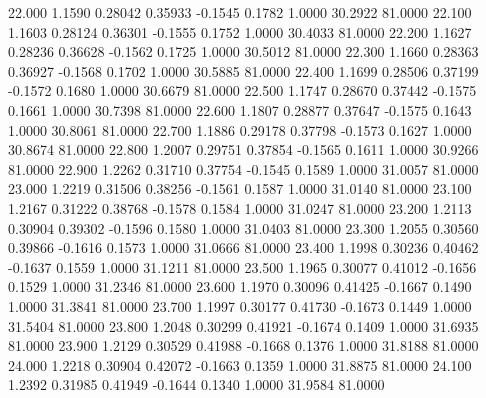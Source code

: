  22.000   1.1590   0.28042   0.35933  -0.1545   0.1782   1.0000  30.2922  81.0000
  22.100   1.1603   0.28124   0.36301  -0.1555   0.1752   1.0000  30.4033  81.0000
  22.200   1.1627   0.28236   0.36628  -0.1562   0.1725   1.0000  30.5012  81.0000
  22.300   1.1660   0.28363   0.36927  -0.1568   0.1702   1.0000  30.5885  81.0000
  22.400   1.1699   0.28506   0.37199  -0.1572   0.1680   1.0000  30.6679  81.0000
  22.500   1.1747   0.28670   0.37442  -0.1575   0.1661   1.0000  30.7398  81.0000
  22.600   1.1807   0.28877   0.37647  -0.1575   0.1643   1.0000  30.8061  81.0000
  22.700   1.1886   0.29178   0.37798  -0.1573   0.1627   1.0000  30.8674  81.0000
  22.800   1.2007   0.29751   0.37854  -0.1565   0.1611   1.0000  30.9266  81.0000
  22.900   1.2262   0.31710   0.37754  -0.1545   0.1589   1.0000  31.0057  81.0000
  23.000   1.2219   0.31506   0.38256  -0.1561   0.1587   1.0000  31.0140  81.0000
  23.100   1.2167   0.31222   0.38768  -0.1578   0.1584   1.0000  31.0247  81.0000
  23.200   1.2113   0.30904   0.39302  -0.1596   0.1580   1.0000  31.0403  81.0000
  23.300   1.2055   0.30560   0.39866  -0.1616   0.1573   1.0000  31.0666  81.0000
  23.400   1.1998   0.30236   0.40462  -0.1637   0.1559   1.0000  31.1211  81.0000
  23.500   1.1965   0.30077   0.41012  -0.1656   0.1529   1.0000  31.2346  81.0000
  23.600   1.1970   0.30096   0.41425  -0.1667   0.1490   1.0000  31.3841  81.0000
  23.700   1.1997   0.30177   0.41730  -0.1673   0.1449   1.0000  31.5404  81.0000
  23.800   1.2048   0.30299   0.41921  -0.1674   0.1409   1.0000  31.6935  81.0000
  23.900   1.2129   0.30529   0.41988  -0.1668   0.1376   1.0000  31.8188  81.0000
  24.000   1.2218   0.30904   0.42072  -0.1663   0.1359   1.0000  31.8875  81.0000
  24.100   1.2392   0.31985   0.41949  -0.1644   0.1340   1.0000  31.9584  81.0000
